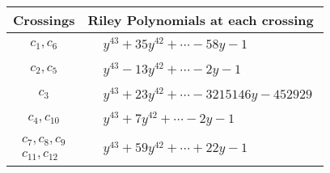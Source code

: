 \documentclass[1p]{elsarticle_modified}
\theoremstyle{definition}
\begin{document}
\begin{tabular}{m{50pt}|m{274pt}}
Crossings & \hspace{64pt}Riley Polynomials at each crossing \\
\hline $$\begin{aligned}c_{1},c_{6}\end{aligned}$$&$\begin{aligned}
&y^{43}+35 y^{42}+\cdots-58 y-1
\end{aligned}$\\
\hline $$\begin{aligned}c_{2},c_{5}\end{aligned}$$&$\begin{aligned}
&y^{43}-13 y^{42}+\cdots-2 y-1
\end{aligned}$\\
\hline $$\begin{aligned}c_{3}\end{aligned}$$&$\begin{aligned}
&y^{43}+23 y^{42}+\cdots-3215146 y-452929
\end{aligned}$\\
\hline $$\begin{aligned}c_{4},c_{10}\end{aligned}$$&$\begin{aligned}
&y^{43}+7 y^{42}+\cdots-2 y-1
\end{aligned}$\\
\hline $$\begin{aligned}c_{7},c_{8},c_{9}\\c_{11},c_{12}\end{aligned}$$&$\begin{aligned}
&y^{43}+59 y^{42}+\cdots+22 y-1
\end{aligned}$\\
\hline
\end{tabular}
\vskip 2pc
\end{document}
